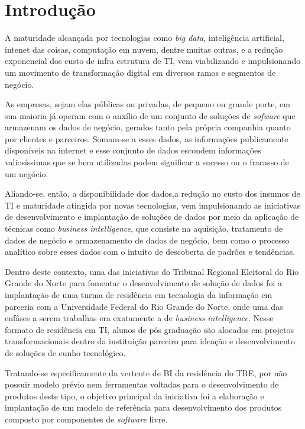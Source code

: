 
\section{Introdução}
A maturidade alcançada por tecnologias como \textit{big data}, inteligência artificial, intenet das coisas, computação em nuvem, dentre muitas outras, e a redução exponencial dos custo de infra estrutura de TI, vem viabilizando e impulsionando um movimento de transformação digital em diversos ramos e segmentos de negócio.

As empresas, sejam elas públicas ou privadas, de pequeno ou grande porte, em sua maioria já operam com o auxílio de um conjunto de soluções de \textit{sofware} que armazenam os dados de negócio, gerados tanto pela própria companhia quanto por clientes e parceiros. Somam-se a esses dados, as informações publicamente disponíveis na internet e esse conjunto de dados escondem informações valiosíssimas que se bem utilizadas podem significar a sucesso ou o fracasso de um negócio. 

Aliando-se, então, a disponibilidade dos dados,a redução no custo dos insumos de TI e maturidade atingida por novas tecnologias, vem impulsionando as iniciativas de desenvolvimento e implantação de soluções de dados por meio da aplicação de técnicas como \textit{business intelligence}, que consiste na aquisição, tratamento de dados de negócio e armazenamento de dados de negócio, bem como o processo analítico sobre esses dados com o intuito de descoberta de padrões e tendências.

Dentro deste contexto, uma das iniciativas do Tribunal Regional Eleitoral do Rio Grande do Norte para fomentar o desenvolvimento de solução de dados foi a implantação de uma turma de residência em tecnologia da informação em parceria com a Universidade Federal do Rio Grande do Norte, onde uma das enfâses a serem trabalhas era exatamente a de \textit{business intelligence}. Nesse formato de residência em TI, alunos de pós graduação são alocados em projetos transformacionais dentro da instituição parceiro para ideação e desenvolvimento de soluções de cunho tecnológico.

Tratando-se especificamente da vertente de BI da residência do TRE, por não possuir modelo prévio nem ferramentas voltadas para o desenvolvimento de produtos deste tipo, o objetivo principal da iniciativa foi a elaboração e implantação de um modelo de referência para desenvolvimento dos produtos composto por componentes de \textit{software} livre. 

